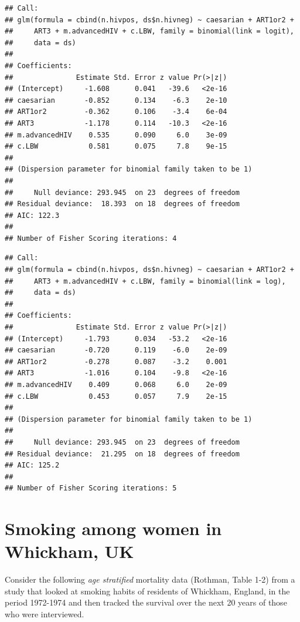 \documentclass[landscape,twocolumn,letterpaper,9pt,reqno]{article}\usepackage[]{graphicx}\usepackage[]{color}
\newenvironment{knitrout}{}{} %
\begin{document}
\begin{knitrout}\small
{}\color{fgcolor}
\begin{verbatim}
## Call:
## glm(formula = cbind(n.hivpos, ds$n.hivneg) ~ caesarian + ART1or2 + 
##     ART3 + m.advancedHIV + c.LBW, family = binomial(link = logit), 
##     data = ds)
## 
## Coefficients:
##               Estimate Std. Error z value Pr(>|z|)
## (Intercept)     -1.608      0.041   -39.6   <2e-16
## caesarian       -0.852      0.134    -6.3    2e-10
## ART1or2         -0.362      0.106    -3.4    6e-04
## ART3            -1.178      0.114   -10.3   <2e-16
## m.advancedHIV    0.535      0.090     6.0    3e-09
## c.LBW            0.581      0.075     7.8    9e-15
## 
## (Dispersion parameter for binomial family taken to be 1)
## 
##     Null deviance: 293.945  on 23  degrees of freedom
## Residual deviance:  18.393  on 18  degrees of freedom
## AIC: 122.3
## 
## Number of Fisher Scoring iterations: 4
\end{verbatim}

\end{knitrout}

\vspace{-0.22in}

\begin{knitrout}\small
{}\color{fgcolor}
\begin{verbatim}
## Call:
## glm(formula = cbind(n.hivpos, ds$n.hivneg) ~ caesarian + ART1or2 + 
##     ART3 + m.advancedHIV + c.LBW, family = binomial(link = log), 
##     data = ds)
## 
## Coefficients:
##               Estimate Std. Error z value Pr(>|z|)
## (Intercept)     -1.793      0.034   -53.2   <2e-16
## caesarian       -0.720      0.119    -6.0    2e-09
## ART1or2         -0.278      0.087    -3.2    0.001
## ART3            -1.016      0.104    -9.8   <2e-16
## m.advancedHIV    0.409      0.068     6.0    2e-09
## c.LBW            0.453      0.057     7.9    2e-15
## 
## (Dispersion parameter for binomial family taken to be 1)
## 
##     Null deviance: 293.945  on 23  degrees of freedom
## Residual deviance:  21.295  on 18  degrees of freedom
## AIC: 125.2
## 
## Number of Fisher Scoring iterations: 5
\end{verbatim}

\end{knitrout}


\clearpage

\section{Smoking among women in Whickham, UK}
Consider the following \textit{age stratified} mortality data (Rothman, Table 1-2) from a study that looked at smoking habits of residents of Whickham, England, in the period 1972-1974 and then tracked the survival over the next 20 years of those who were interviewed. 
\end{document}
